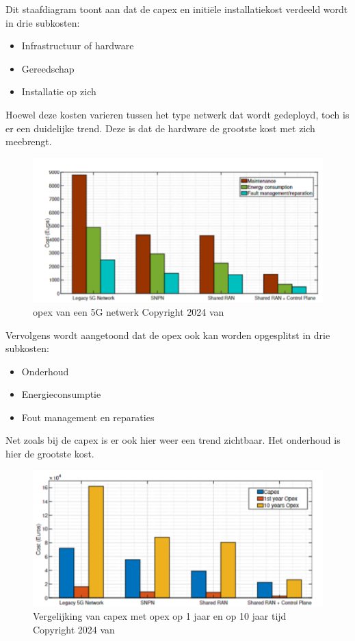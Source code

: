 Dit staafdiagram toont aan dat de \gls{capex} en initiële installatiekost verdeeld wordt in drie subkosten:

\begin{itemize}
  \item Infrastructuur of hardware
  \item Gereedschap
  \item Installatie op zich
\end{itemize}

Hoewel deze kosten varieren tussen het type netwerk dat wordt gedeployd, toch is er een duidelijke trend. Deze is dat de hardware de grootste kost met zich meebrengt.

\begin{figure}[H]
  \includegraphics[width=\linewidth]{../graphics/opex.png}
  \caption{\gls{opex} van een 5G netwerk \autocite[Door][]{Hilary2024} Copyright 2024 van \textcite{Hilary2024}}
  \label{fig:opex}
\end{figure}

Vervolgens wordt aangetoond dat de \gls{opex} ook kan worden opgesplitst in drie subkosten:

\begin{itemize}
  \item Onderhoud
  \item Energieconsumptie
  \item Fout management en reparaties
\end{itemize}

Net zoals bij de \gls{capex} is er ook hier weer een trend zichtbaar. Het onderhoud is hier de grootste kost.

\begin{figure}[H]
  \includegraphics[width=\linewidth]{../graphics/capex-opex.png}
  \caption{Vergelijking van \gls{capex} met \gls{opex} op 1 jaar en op 10 jaar tijd \autocite[Door][]{Hilary2024} Copyright 2024 van \textcite{Hilary2024}}
  \label{fig:capex-vs-opex}
\end{figure}

